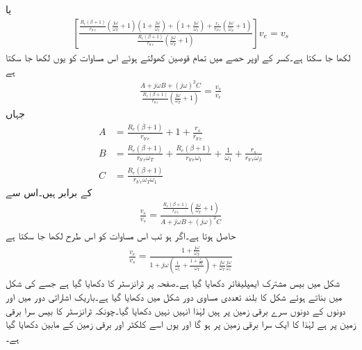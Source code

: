 یا
\begin{align*}
\left[\frac{\frac{R_e\left(\beta+1 \right)}{r_{b'e}} \left(\frac{j \omega}{\omega_T}+1 \right)\left(1+\frac{j \omega}{\omega_1}\right)+\left(1+\frac{j \omega}{\omega_1}\right)+\frac{r_s}{r_{b'e}}\left(\frac{j \omega}{\omega_{\beta}}+1\right)}{\frac{R_e\left(\beta+1 \right)}{r_{b'e}} \left(\frac{j \omega}{\omega_T}+1 \right)}\right] v_e=v_s
\end{align*}
لکھا جا سکتا ہے۔کسر کے اوپر حصے میں تمام قوصین کھولتے ہوئے اس مساوات کو یوں لکھا جا سکتا ہے
\begin{align*}
\frac{A+j \omega B +\left(j \omega \right)^2  C}{\frac{R_e\left(\beta+1 \right)}{r_{b'e}} \left(\frac{j \omega}{\omega_T}+1 \right)}=\frac{v_s}{v_e}
\end{align*}
جہاں
\begin{align*}
A&=\frac{R_e\left(\beta+1 \right)}{r_{b'e}}+1+\frac{r_s}{r_{b'e}}\\
B&=\frac{R_e\left(\beta+1 \right)}{r_{b'e} \omega_T} +\frac{R_e\left(\beta+1 \right)}{r_{b'e}\omega_1}+\frac{1}{\omega_1}+\frac{r_s}{r_{b'e}\omega_{\beta}}\\
C&=\frac{R_e\left(\beta+1 \right)}{r_{b'e} \omega_T \omega_1}
\end{align*}
کے برابر ہیں۔اس سے
\begin{align}
\frac{v_e}{v_s}=\frac{\frac{R_e\left(\beta+1 \right)}{r_{b'e}} \left(\frac{j \omega}{\omega_T}+1 \right)}{A+j \omega B +\left(j \omega \right)^2  C}
\end{align}
حاصل ہوتا ہے۔اگر   ہو تب اس مساوات کو اس طرح لکھا جا سکتا ہے
\begin{align}
\frac{v_e}{v_s}=\frac{1+\frac{j \omega}{\omega_T}}{1+j \omega \left(\frac{1}{\omega_1}+\frac{1+\frac{r_s}{R_e}}{\omega_T} \right)+\frac{j \omega}{\omega_T}\frac{j \omega}{\omega_1}}
\end{align}
شکل  میں بیس  مشترک ایمپلیفائر دکھایا گیا ہے۔صفحہ  پر ٹرانزسٹر کا  دکھایا گیا ہے جسے  کی شکل میں بناتے ہوئے شکل  کا بلند تعددی مساوی دور شکل  میں دکھایا گیا ہے۔باریک اشاراتی دور میں  اور  دونوں کے دونوں سرے برقی زمین پر ہیں لہٰذا انہیں نہیں دکھایا گیا۔چونکہ ٹرانزسٹر کا بیس  سرا برقی زمین پر ہے لہٰذا  کا ایک سرا برقی زمین پر ہو گا اور یوں اسے کلکٹر  اور برقی زمین کے مابین دکھایا گیا ہے۔ 


